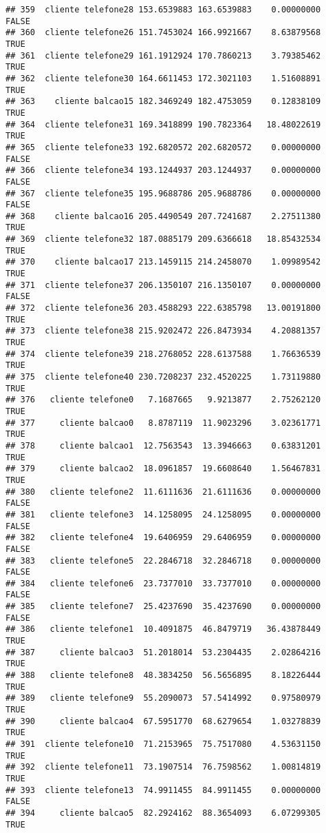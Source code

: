 \documentclass[
]{article}
\begin{document}
\begin{verbatim}
## 359  cliente telefone28 153.6539883 163.6539883    0.00000000    FALSE
## 360  cliente telefone26 151.7453024 166.9921667    8.63879568     TRUE
## 361  cliente telefone29 161.1912924 170.7860213    3.79385462     TRUE
## 362  cliente telefone30 164.6611453 172.3021103    1.51608891     TRUE
## 363    cliente balcao15 182.3469249 182.4753059    0.12838109     TRUE
## 364  cliente telefone31 169.3418899 190.7823364   18.48022619     TRUE
## 365  cliente telefone33 192.6820572 202.6820572    0.00000000    FALSE
## 366  cliente telefone34 193.1244937 203.1244937    0.00000000    FALSE
## 367  cliente telefone35 195.9688786 205.9688786    0.00000000    FALSE
## 368    cliente balcao16 205.4490549 207.7241687    2.27511380     TRUE
## 369  cliente telefone32 187.0885179 209.6366618   18.85432534     TRUE
## 370    cliente balcao17 213.1459115 214.2458070    1.09989542     TRUE
## 371  cliente telefone37 206.1350107 216.1350107    0.00000000    FALSE
## 372  cliente telefone36 203.4588293 222.6385798   13.00191800     TRUE
## 373  cliente telefone38 215.9202472 226.8473934    4.20881357     TRUE
## 374  cliente telefone39 218.2768052 228.6137588    1.76636539     TRUE
## 375  cliente telefone40 230.7208237 232.4520225    1.73119880     TRUE
## 376   cliente telefone0   7.1687665   9.9213877    2.75262120     TRUE
## 377     cliente balcao0   8.8787119  11.9023296    3.02361771     TRUE
## 378     cliente balcao1  12.7563543  13.3946663    0.63831201     TRUE
## 379     cliente balcao2  18.0961857  19.6608640    1.56467831     TRUE
## 380   cliente telefone2  11.6111636  21.6111636    0.00000000    FALSE
## 381   cliente telefone3  14.1258095  24.1258095    0.00000000    FALSE
## 382   cliente telefone4  19.6406959  29.6406959    0.00000000    FALSE
## 383   cliente telefone5  22.2846718  32.2846718    0.00000000    FALSE
## 384   cliente telefone6  23.7377010  33.7377010    0.00000000    FALSE
## 385   cliente telefone7  25.4237690  35.4237690    0.00000000    FALSE
## 386   cliente telefone1  10.4091875  46.8479719   36.43878449     TRUE
## 387     cliente balcao3  51.2018014  53.2304435    2.02864216     TRUE
## 388   cliente telefone8  48.3834250  56.5656895    8.18226444     TRUE
## 389   cliente telefone9  55.2090073  57.5414992    0.97580979     TRUE
## 390     cliente balcao4  67.5951770  68.6279654    1.03278839     TRUE
## 391  cliente telefone10  71.2153965  75.7517080    4.53631150     TRUE
## 392  cliente telefone11  73.1907514  76.7598562    1.00814819     TRUE
## 393  cliente telefone13  74.9911455  84.9911455    0.00000000    FALSE
## 394     cliente balcao5  82.2924162  88.3654093    6.07299305     TRUE

\end{verbatim}
\end{document}
